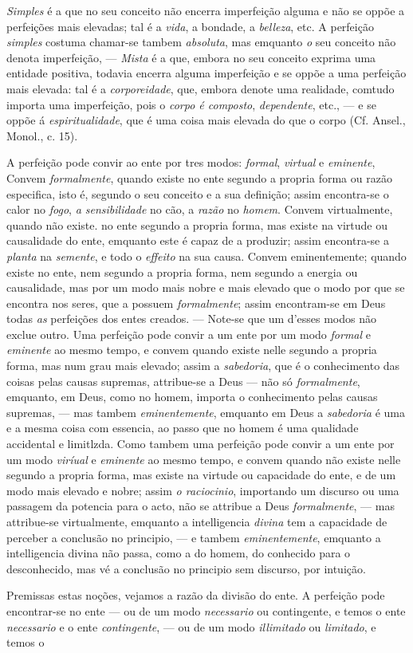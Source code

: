 \emph{Simples} é a que no seu conceito não encerra imperfeição alguma e não se oppõe a perfeições mais elevadas; tal é a \emph{vida}, a bondade, a \emph{belleza}, etc. A perfeição \emph{simples} costuma chamar-se tambem \emph{absoluta}, mas emquanto \emph{o} seu conceito não denota imperfeição, --- \emph{Mista} é a que, embora no seu conceito exprima uma entidade positiva, todavia encerra alguma imperfeição e se oppõe a uma perfeição mais elevada: tal é a \emph{corporeidade}, que, embora denote uma realidade, comtudo importa uma imperfeição, pois o \emph{corpo é composto}, \emph{dependente}, etc., --- e se oppõe á \emph{espiritualidade}, que é uma coisa mais elevada do que o corpo (Cf. Ansel., Monol., c. 15).\par A perfeição pode convir ao ente por tres modos: \emph{formal}, \emph{virtual} e \emph{eminente}, Convem \emph{formalmente}, quando existe no ente segundo a propria forma ou razão especifica, isto é, segundo o seu conceito e a sua definição; assim encontra-se o calor no \emph{fogo}, \emph{a sensibilidade} no cão, a \emph{razão} no \emph{homem}. Convem virtualmente, quando não existe. no ente segundo a propria forma, mas existe na virtude ou causalidade do ente, emquanto este é capaz de a produzir; assim encontra-se a \emph{planta} na \emph{semente}, e todo o \emph{effeito} na sua causa. Convem eminentemente; quando existe no ente, nem segundo a propria forma, nem segundo a energia ou causalidade, mas por um modo mais nobre e mais elevado que o modo por que se encontra nos seres, que a possuem \emph{formalmente}; assim encontram-se em Deus todas \emph{as} perfeições dos entes creados. --- Note-se que um d'esses modos não exclue outro. Uma perfeição pode convir a um ente por um modo \emph{formal} e \emph{eminente} ao mesmo tempo, e convem quando existe nelle segundo a propria forma, mas num grau mais elevado; assim a \emph{sabedoria}, que é o conhecimento das coisas pelas causas supremas, attribue-se a Deus --- não só \emph{formalmente}, emquanto, em Deus, como no homem, importa o conhecimento pelas causas supremas, --- mas tambem \emph{eminentemente}, emquanto em Deus a \emph{sabedoria} é uma e a mesma coisa com essencia, ao passo que no homem é uma qualidade accidental e limitlzda. Como tambem uma perfeição pode convir a um ente por um modo \emph{viríual} e \emph{eminente} ao mesmo tempo, e convem quando não existe nelle segundo a propria forma, mas existe na virtude ou capacidade do ente, e de um modo mais elevado e nobre; assim \emph{o raciocinio}, importando um discurso ou uma passagem da potencia para o acto, não se attribue a Deus \emph{formalmente}, --- mas attribue-se virtualmente, emquanto a intelligencia \emph{divina} tem a capacidade de perceber a conclusão no principio, — e tambem \emph{eminentemente}, emquanto a intelligencia divina não passa, como a do homem, do conhecido para o desconhecido, mas vé a conclusão no principio sem discurso, por intuição.\par Premissas estas noções, vejamos a razão da divisão do ente. A perfeição pode encontrar-se no ente --- ou de um modo \emph{necessario} ou contingente, e temos o ente \emph{necessario} e o ente \emph{contingente}, --- ou de um modo \emph{illimitado} ou \emph{limitado}, e temos o 